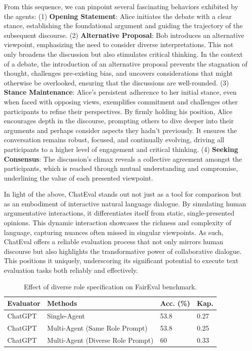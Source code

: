 From this sequence, we can pinpoint several fascinating behaviors exhibited by the agents: (1) \textbf{Opening Statement}: Alice initiates the debate with a clear stance, establishing the foundational argument and guiding the trajectory of the subsequent discourse. (2) \textbf{Alternative Proposal}: Bob introduces an alternative viewpoint, emphasizing the need to consider diverse interpretations. This not only broadens the discussion but also stimulates critical thinking. In the context of a debate, the introduction of an alternative proposal prevents the stagnation of thought, challenges pre-existing bias, and uncovers considerations that might otherwise be overlooked, ensuring that the discussions are well-rounded. (3) \textbf{Stance Maintenance}: Alice's persistent adherence to her initial stance, even when faced with opposing views, exemplifies commitment and challenges other participants to refine their perspectives. By firmly holding his position, Alice encourages depth in the discourse, prompting others to dive deeper into their arguments and perhaps consider aspects they hadn't previously. It ensures the conversation remains robust, focused, and continually evolving, driving all participants to a higher level of engagement and critical thinking. (4) \textbf{Seeking Consensus}: The discussion's climax reveals a collective agreement amongst the participants, which is reached through mutual understanding and compromise, underlining the value of each presented viewpoint.


In light of the above, ChatEval stands out not just as a tool for comparison but as an embodiment of interactive natural language dialogue. By simulating human argumentative interactions, it differentiates itself from static, single-presented opinions. This dynamic interaction showcases the richness and complexity of language, capturing nuances often missed in singular viewpoints. As such, ChatEval offers a reliable evaluation process that not only mirrors human discourse but also highlights the transformative power of collaborative dialogue. This positions it uniquely, underscoring its significant potential to execute text evaluation tasks both reliably and effectively.


\begin{table}[hbpt]
\caption{Effect of diverse role specification on FairEval benchmark.}
\label{tab:same_vs_diverse}
\begin{center}
\begin{tabular}{llll}
\hline
\textbf{Evaluator} & \textbf{Methods}                           & \textbf{Acc. (\%)} & \textbf{Kap.} \\ \hline
ChatGPT   & Single-Agent                      & 53.8      & 0.27     \\
ChatGPT   & Multi-Agent (Same Role Prompt)    & 53.8      & 0.25    \\
ChatGPT   & Multi-Agent (Diverse Role Prompt) & 60        & 0.33    
\end{tabular}
\end{center}
\end{table}


